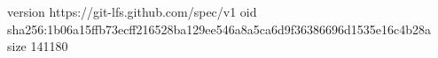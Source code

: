 version https://git-lfs.github.com/spec/v1
oid sha256:1b06a15ffb73ecff216528ba129ee546a8a5ca6d9f36386696d1535e16c4b28a
size 141180
